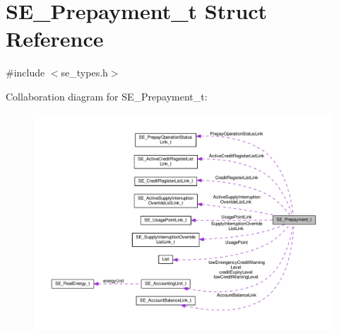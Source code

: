 \hypertarget{structSE__Prepayment__t}{}\section{S\+E\+\_\+\+Prepayment\+\_\+t Struct Reference}
\label{structSE__Prepayment__t}


{\ttfamily \#include $<$se\+\_\+types.\+h$>$}



Collaboration diagram for S\+E\+\_\+\+Prepayment\+\_\+t\+:\nopagebreak
\begin{figure}[H]
\begin{center}
\leavevmode
\includegraphics[width=350pt]{structSE__Prepayment__t__coll__graph}
\end{center}
\end{figure}
